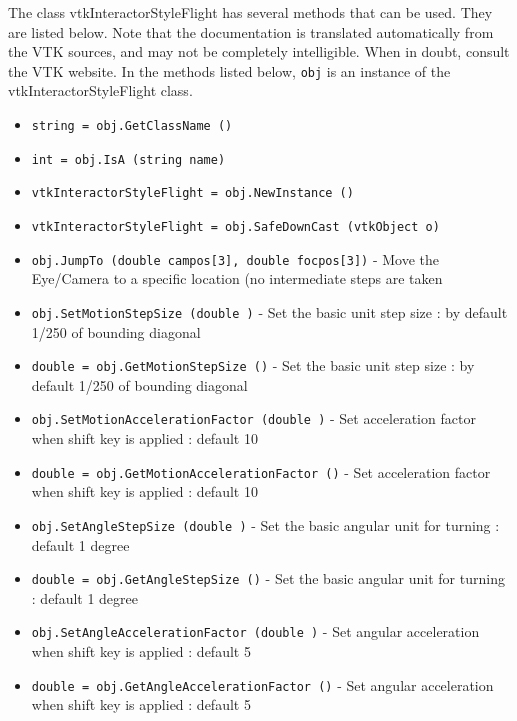 The class vtkInteractorStyleFlight has several methods that can be used.
  They are listed below.
Note that the documentation is translated automatically from the VTK sources,
and may not be completely intelligible.  When in doubt, consult the VTK website.
In the methods listed below, \verb|obj| is an instance of the vtkInteractorStyleFlight class.
\begin{itemize}
\item  \verb|string = obj.GetClassName ()|

\item  \verb|int = obj.IsA (string name)|

\item  \verb|vtkInteractorStyleFlight = obj.NewInstance ()|

\item  \verb|vtkInteractorStyleFlight = obj.SafeDownCast (vtkObject o)|

\item  \verb|obj.JumpTo (double campos[3], double focpos[3])| -  Move the Eye/Camera to a specific location (no intermediate
 steps are taken

\item  \verb|obj.SetMotionStepSize (double )| -  Set the basic unit step size : by default 1/250 of bounding diagonal

\item  \verb|double = obj.GetMotionStepSize ()| -  Set the basic unit step size : by default 1/250 of bounding diagonal

\item  \verb|obj.SetMotionAccelerationFactor (double )| -  Set acceleration factor when shift key is applied : default 10

\item  \verb|double = obj.GetMotionAccelerationFactor ()| -  Set acceleration factor when shift key is applied : default 10

\item  \verb|obj.SetAngleStepSize (double )| -  Set the basic angular unit for turning : default 1 degree

\item  \verb|double = obj.GetAngleStepSize ()| -  Set the basic angular unit for turning : default 1 degree

\item  \verb|obj.SetAngleAccelerationFactor (double )| -  Set angular acceleration when shift key is applied : default 5

\item  \verb|double = obj.GetAngleAccelerationFactor ()| -  Set angular acceleration when shift key is applied : default 5


\end{itemize}
